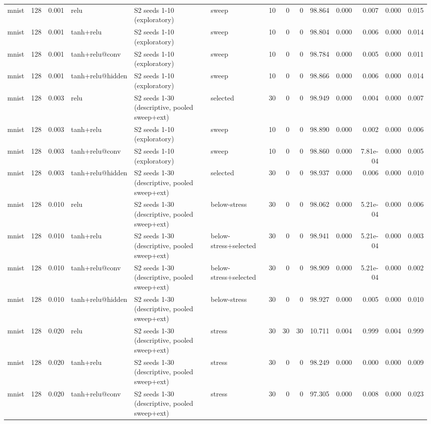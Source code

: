 \begin{table}[htbp]
{\begin{tabular}{@{}lrrlllrrrrrrrr@{}}
mnist & 128 & 0.001 & relu & S2 seeds 1-10 (exploratory) & sweep & 10 & 0 & 0 & 98.864 & 0.000 & 0.007 & 0.000 & 0.015 \\
mnist & 128 & 0.001 & tanh+relu & S2 seeds 1-10 (exploratory) & sweep & 10 & 0 & 0 & 98.804 & 0.000 & 0.006 & 0.000 & 0.014 \\
mnist & 128 & 0.001 & tanh+relu@conv & S2 seeds 1-10 (exploratory) & sweep & 10 & 0 & 0 & 98.784 & 0.000 & 0.005 & 0.000 & 0.011 \\
mnist & 128 & 0.001 & tanh+relu@hidden & S2 seeds 1-10 (exploratory) & sweep & 10 & 0 & 0 & 98.866 & 0.000 & 0.006 & 0.000 & 0.014 \\
mnist & 128 & 0.003 & relu & S2 seeds 1-30 (descriptive, pooled sweep+ext) & selected & 30 & 0 & 0 & 98.949 & 0.000 & 0.004 & 0.000 & 0.007 \\
mnist & 128 & 0.003 & tanh+relu & S2 seeds 1-10 (exploratory) & sweep & 10 & 0 & 0 & 98.890 & 0.000 & 0.002 & 0.000 & 0.006 \\
mnist & 128 & 0.003 & tanh+relu@conv & S2 seeds 1-10 (exploratory) & sweep & 10 & 0 & 0 & 98.860 & 0.000 & 7.81e-04 & 0.000 & 0.005 \\
mnist & 128 & 0.003 & tanh+relu@hidden & S2 seeds 1-30 (descriptive, pooled sweep+ext) & selected & 30 & 0 & 0 & 98.937 & 0.000 & 0.006 & 0.000 & 0.010 \\
mnist & 128 & 0.010 & relu & S2 seeds 1-30 (descriptive, pooled sweep+ext) & below-stress & 30 & 0 & 0 & 98.062 & 0.000 & 5.21e-04 & 0.000 & 0.006 \\
mnist & 128 & 0.010 & tanh+relu & S2 seeds 1-30 (descriptive, pooled sweep+ext) & below-stress+selected & 30 & 0 & 0 & 98.941 & 0.000 & 5.21e-04 & 0.000 & 0.003 \\
mnist & 128 & 0.010 & tanh+relu@conv & S2 seeds 1-30 (descriptive, pooled sweep+ext) & below-stress+selected & 30 & 0 & 0 & 98.909 & 0.000 & 5.21e-04 & 0.000 & 0.002 \\
mnist & 128 & 0.010 & tanh+relu@hidden & S2 seeds 1-30 (descriptive, pooled sweep+ext) & below-stress & 30 & 0 & 0 & 98.927 & 0.000 & 0.005 & 0.000 & 0.010 \\
mnist & 128 & 0.020 & relu & S2 seeds 1-30 (descriptive, pooled sweep+ext) & stress & 30 & 30 & 30 & 10.711 & 0.004 & 0.999 & 0.004 & 0.999 \\
mnist & 128 & 0.020 & tanh+relu & S2 seeds 1-30 (descriptive, pooled sweep+ext) & stress & 30 & 0 & 0 & 98.249 & 0.000 & 0.000 & 0.000 & 0.009 \\
mnist & 128 & 0.020 & tanh+relu@conv & S2 seeds 1-30 (descriptive, pooled sweep+ext) & stress & 30 & 0 & 0 & 97.305 & 0.000 & 0.008 & 0.000 & 0.023 \\

\end{tabular}}
\end{table}
